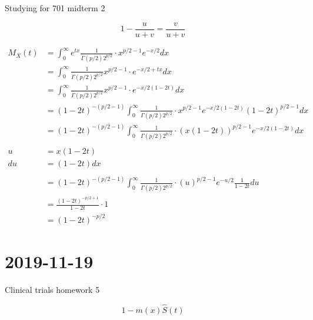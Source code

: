 \documentclass[]{article}
\begin{document}
Studying for 701 midterm 2

$$
1 - \frac{ u }{ u+v } = \frac{ v }{ u+v }
$$



\begin{align*}
	M_X(t) & = \int_{0} ^{\infty} e^{t x} \frac{ 1 }{ \Gamma(p/2) 2^{p/2}} \cdot  x^{p/2-1}  e^{-x/2} dx\\
		& = \int_{0} ^{\infty} \frac{ 1 }{ \Gamma(p/2) 2^{p/2}}  x^{p/2-1} \cdot e^{-x/2 + tx} dx\\
		& = \int_{0} ^{\infty} \frac{ 1 }{ \Gamma(p/2) 2^{p/2}}  x^{p/2-1} \cdot e^{-x/2 (1-2t)} dx\\
		& = (1-2t)^{-(p/2-1)}  \int_{0} ^{\infty} \frac{ 1 }{ \Gamma(p/2) 2^{p/2}} \cdot x^{p/2-1}  e^{-x/2 (1-2t)}  (1-2t)^{p/2-1} dx\\
		& = (1-2t)^{-(p/2-1)}  \int_{0} ^{\infty} \frac{ 1 }{ \Gamma(p/2) 2^{p/2}} \cdot (x (1-2t))^{p/2-1}  e^{-x/2 (1-2t)}  dx\\ \\
		u & = x(1-2t) \\
		du & = (1-2t) dx \\ \\
		& = (1-2t)^{-(p/2-1)}  \int_{0} ^{\infty} \frac{ 1 }{ \Gamma(p/2) 2^{p/2}} \cdot (u)^{p/2-1}  e^{-u/2 } \frac{ 1 }{ 1-2t }  du\\ 
		& = \frac{ (1-2t)^{-p/2 + 1} }{ 1-2t } \cdot 1 \\
		& = (1-2t)^{-p/2}
\end{align*}




\section*{2019-11-19}
Clinical trials homework 5

$$
1-m(x)    \hat{S}(t)
$$
\end{document}

